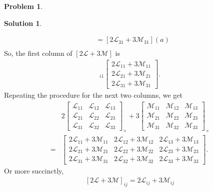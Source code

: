 \documentclass{article}
\theoremstyle{definition}
\newtheorem*{prob*}{Problem}
\newtheorem*{sln*}{Solution}
\newcommand{\lag}{\mathcal{L}}
\newcommand{\M}{\mathcal{M}}
\begin{document}
\begin{prob*}
\begin{sln*}
\begin{enumerate}
\begin{enumerate}
\begin{align*}
			&= [2\lag_{31} + 3\M_{31}](a)\\
			\end{align*}
			So, the first column of $[2\lag + 3\M]$ is 
			\begin{align*}
			[2\lag + 3\M]_{i1}
			\begin{bmatrix}
			2\lag_{11} + 3\M_{11}\\
			2\lag_{21} + 3\M_{21}\\
			2\lag_{31} + 3\M_{31}
			\end{bmatrix}.
			\end{align*}
			Repeating the procedure for the next two columns, we get
			\begin{align*}
			&2\begin{bmatrix}
			\lag_{11} & \lag_{12} & \lag_{13}\\
			\lag_{21} & \lag_{22} & \lag_{23}\\
			\lag_{31} & \lag_{32} & \lag_{33}
			\end{bmatrix}_\times 
			+ 
			3\begin{bmatrix}
			\M_{11} & \M_{12} & \M_{13}\\
			\M_{21} & \M_{22} & \M_{23}\\
			\M_{31} & \M_{32} & \M_{33}
			\end{bmatrix}_\times\\
			=
			& \begin{bmatrix}
			2\lag_{11} + 3\M_{11} & 2\lag_{12} + 3\M_{12} & 2\lag_{13} + 3\M_{13}\\
			2\lag_{21} + 3\M_{21} & 2\lag_{22} + 3\M_{22} & 2\lag_{23} + 3\M_{23}\\
			2\lag_{31} + 3\M_{31} & 2\lag_{32} + 3\M_{32} & 2\lag_{33} + 3\M_{33}
			\end{bmatrix}.
			\end{align*}
			Or more succinctly, 
			\begin{align*}
			\boxed{[2\lag + 3\M]_{ij} = 2\lag_{ij} + 3\M_{ij}}
			\end{align*}
			
			
			
			\newpage
			
			
			 

\end{enumerate}
\end{enumerate}
\end{sln*}
\end{prob*}
\end{document}
